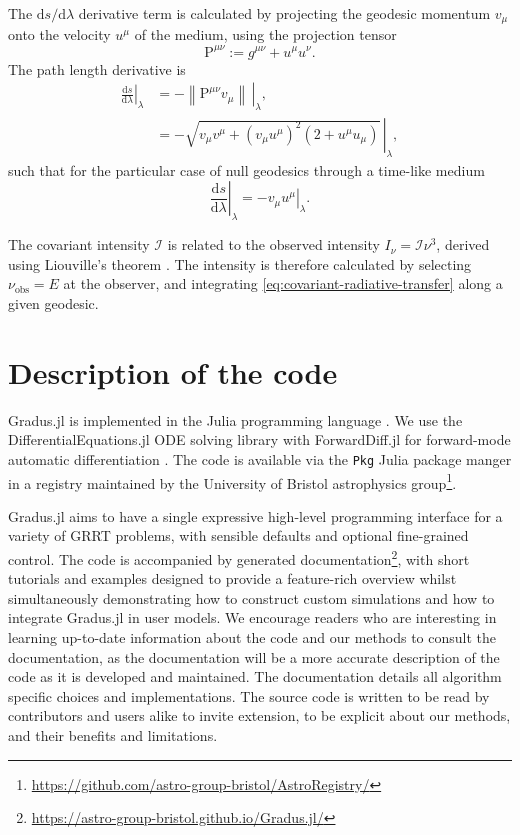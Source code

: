 \documentclass[fleqn,usenatbib]{mnras}
\newcommand{\Gradus}{Gradus.jl }
\renewcommand{\d}{\text{d}}
\begin{document}
The $\d s / \d \lambda$ derivative term is calculated by projecting the geodesic momentum $v_\mu$ onto the velocity $u^\mu$ of the medium, using the projection tensor
\begin{equation}
    \mathrm{P}^{\mu\nu} := g^{\mu\nu} + u^\mu u^\nu.
\end{equation}
The path length derivative is
\begin{align}
    \left. \frac{\d s}{\d \lambda} \right\rvert_\lambda
    &= - \left. \left\lVert \mathrm{P}^{\mu\nu} v_\mu\right\rVert\, \right\rvert_\lambda,\\
    &= - \left. \sqrt{v_\mu v^\mu + \left(v_\mu u^\mu\right)^2 \left(2 + u^\mu u_\mu\right)} \, \right\rvert_\lambda,
\end{align}
such that for the particular case of null geodesics through a time-like medium
\begin{equation}
    \left. \frac{\d s}{\d \lambda} \right\rvert_\lambda = - \left. v_\mu u^\mu \right\rvert_\lambda.
\end{equation}

The covariant intensity $\mathcal{I}$ is related to the observed intensity $I_\nu = \mathcal{I} \nu^3$, derived using Liouville's theorem \citep{todo}. The intensity is therefore calculated by selecting $\nu_\text{obs} = E$ at the observer, and integrating \eqref{eq:covariant-radiative-transfer} along a given geodesic.


\section{Description of the code}
\label{sec:description-of-code}

\Gradus is implemented in the Julia programming language
\citep{Bezanson_Julia_A_fresh_2017}. We use the DifferentialEquations.jl ODE
solving library with ForwardDiff.jl for forward-mode automatic differentiation
\citep{RevelsLubinPapamarkou2016}. The code is available via the \texttt{Pkg}
Julia package manger in a registry maintained by the University of
Bristol astrophysics
group\footnote{\url{https://github.com/astro-group-bristol/AstroRegistry/}}.

\Gradus aims to have a single expressive high-level programming interface for a
variety of GRRT problems, with sensible defaults and optional fine-grained
control. The code is accompanied by generated
documentation\footnote{\url{https://astro-group-bristol.github.io/Gradus.jl/}},
with short tutorials and examples designed to provide a feature-rich overview
whilst simultaneously demonstrating how to construct custom simulations and how
to integrate \Gradus in user models. We encourage readers who are interesting in
learning up-to-date information about the code and our methods to consult the
documentation, as the documentation will be a more accurate description of the
code as it is developed and maintained. The documentation details all algorithm
specific choices and implementations. The source code is written to be read by
contributors and users alike to invite extension, to be explicit about our
methods, and their benefits and limitations.
\end{document}
